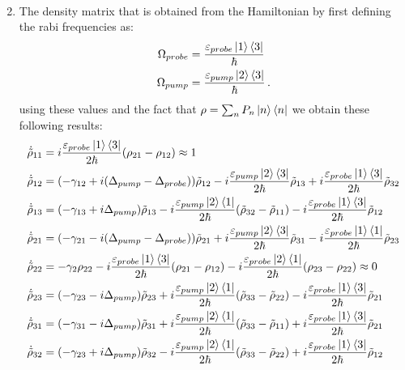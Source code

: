 \documentclass[12pt, a4paper]{article}
\begin{document}
\begin{enumerate}
\begin{gather}
    \end{gather}
    \item The density matrix that is obtained from the Hamiltonian by first defining the rabi frequencies as:
    \begin{align}
      \Omega_{probe} &= \frac{\varepsilon_{probe}\ket{1}\bra{3}}{\hbar}\\
      \Omega_{pump} &= \frac{\varepsilon_{pump}\ket{2}\bra{3}}{\hbar}\,.
    \end{align}
    using these values and the fact that \(\rho = \sum_{n}P_n\ket{n}\bra{n}\) we obtain these following results:
    \begin{align}
      \dot{\tilde{\rho}}_{11} &= i \frac{\varepsilon_{probe}\ket{1}\bra{3}}{2\hbar}(\rho_{21}-\rho_{12}) \approx 1\\
      \dot{\tilde{\rho}}_{12} &= (-\gamma_{12} + i (\Delta_{pump}- \Delta_{probe}))\tilde{\rho}_{12} - i \frac{\varepsilon_{pump}\ket{2}\bra{3}}{2\hbar}\tilde{\rho}_{13} + i \frac{\varepsilon_{probe}\ket{1}\bra{3}}{2\hbar}\tilde{\rho}_{32}\\
      \dot{\tilde{\rho}}_{13} &= (- \gamma_{13} + i\Delta_{pump})\tilde{\rho}_{13} - i \frac{\varepsilon_{pump}\ket{2}\bra{1}}{2\hbar}(\tilde{\rho}_{32}-\tilde{\rho}_{11}) - i \frac{\varepsilon_{probe}\ket{1}\bra{3}}{2\hbar}\tilde{\rho}_{12}\\
      \dot{\tilde{\rho}}_{21} &= (-\gamma_{21}-i(\Delta_{pump}-\Delta_{probe}))\tilde{\rho}_{21}+i\frac{\varepsilon_{pump}\ket{2}\bra{3}}{2\hbar}\tilde{\rho}_{31}-i \frac{\varepsilon_{probe}\ket{1}\bra{1}}{2\hbar}\tilde{\rho}_{23}\\
      \dot{\tilde{\rho}}_{22} &= - \gamma_{2} \rho_{22} - i \frac{\varepsilon_{probe}\ket{1}\bra{3}}{2\hbar}(\rho_{21}- \rho_{12}) - i \frac{\varepsilon_{probe}\ket{2}\bra{1}}{2\hbar}(\rho_{23} - \rho_{22}) \approx 0\\
      \dot{\tilde{\rho}}_{23} &= (-\gamma_{23} - i \Delta_{pump})\tilde{\rho}_{23} + i \frac{\varepsilon_{pump}\ket{2}\bra{1}}{2\hbar}(\tilde{\rho}_{33} - \tilde{\rho}_{22}) - i \frac{\varepsilon_{probe}\ket{1}\bra{3}}{2\hbar}\tilde{\rho}_{21}\\
      \dot{\tilde{\rho}}_{31} &= (-\gamma_{31} - i \Delta_{pump})\tilde{\rho}_{31} + i \frac{\varepsilon_{pump}\ket{2}\bra{1}}{2\hbar}(\tilde{\rho}_{33}-\tilde{\rho}_{11}) + i \frac{\varepsilon_{probe}\ket{1}\bra{3}}{2\hbar}\tilde{\rho}_{21}\\
      \dot{\tilde{\rho}}_{32} &= (-\gamma_{23} + i \Delta_{pump})\tilde{\rho}_{32} - i \frac{\varepsilon_{pump}\ket{2}\bra{1}}{2\hbar}(\tilde{\rho}_{33} - \tilde{\rho}_{22}) + i \frac{\varepsilon_{probe}\ket{1}\bra{3}}{2\hbar}\tilde{\rho}_{12}\\

\end{align}
\end{enumerate}
\end{document}
